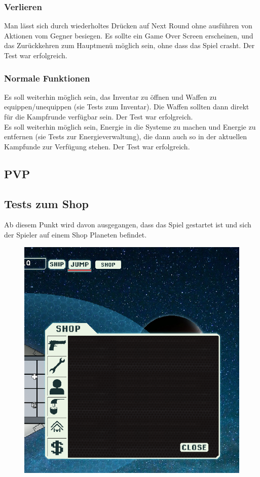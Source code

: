 \documentclass[fontsize=12pt,paper=a4,twoside]{scrartcl}
\begin{document}
\subsubsection{Verlieren}
Man lässt sich durch wiederholtes Drücken auf Next Round ohne ausführen von Aktionen vom Gegner besiegen. Es sollte ein Game Over Screen erscheinen, und das Zurückkehren zum Hauptmenü möglich sein, ohne dass das Spiel crasht.  Der Test war erfolgreich. \\
\subsubsection{Normale Funktionen} 
Es soll weiterhin möglich sein, das Inventar zu öffnen und Waffen zu equippen/unequippen (sie Tests zum Inventar). Die Waffen sollten dann direkt für die Kampfrunde verfügbar sein. Der Test war erfolgreich. \\
Es soll weiterhin möglich sein, Energie in die Systeme zu machen und Energie zu entfernen (sie Tests zur Energieverwaltung), die dann auch so in der aktuellen Kampfunde zur Verfügung stehen. Der Test war erfolgreich. \\

\subsection{PVP}



\subsection{Tests zum Shop}
Ab diesem Punkt wird davon ausgegangen, dass das Spiel gestartet ist und sich der Spieler auf einem Shop Planeten befindet. \\
\begin{figure}[h!]
\centering
\includegraphics[width=0.5\linewidth]{images/shop.png}
\end{figure}
\end{document}
